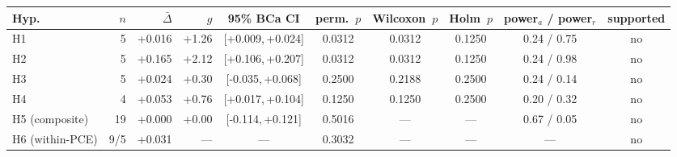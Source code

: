 \begin{tabular}{l r r r c c c c c c}
\toprule
Hyp. & $n$ & $\bar\Delta$ & $g$ & 95\% BCa CI & perm.~$p$ & Wilcoxon~$p$ & Holm~$p$ & power$_a$ / power$_r$ & supported \\
\midrule
H1 & 5 & +0.016 & +1.26 & [+0.009,\,+0.024] & 0.0312 & 0.0312 & 0.1250 & 0.24 / 0.75 & no \\
H2 & 5 & +0.165 & +2.12 & [+0.106,\,+0.207] & 0.0312 & 0.0312 & 0.1250 & 0.24 / 0.98 & no \\
H3 & 5 & +0.024 & +0.30 & [-0.035,\,+0.068] & 0.2500 & 0.2188 & 0.2500 & 0.24 / 0.14 & no \\
H4 & 4 & +0.053 & +0.76 & [+0.017,\,+0.104] & 0.1250 & 0.1250 & 0.2500 & 0.20 / 0.32 & no \\
H5 (composite) & 19 & +0.000 & +0.00 & [-0.114,\,+0.121] & 0.5016 & --- & --- & 0.67 / 0.05 & no \\
H6 (within-PCE) & 9/5 & +0.031 & --- & --- & 0.3032 & --- & --- & --- & no \\
\bottomrule
\end{tabular}

